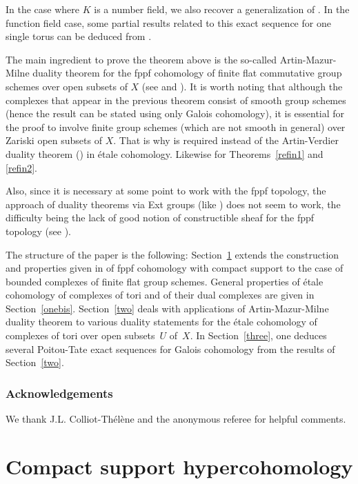 \documentclass[JEP,XML,SOM,Unicode, NoEqCountersInSection]{cedram}
\theoremstyle{plain}
\theoremstyle{definition}
\begin{document}
In the case where $K$ is a number field, we also recover a generalization of \cite[Th.\,6.1 \& 6.3]{demphd}. In the function field case, some partial results related to this exact sequence for one single torus can be deduced from \cite[\S6]{gonz1}.

The main ingredient to prove the theorem above is the so-called Artin-Mazur-Milne duality theorem for the fppf cohomology of finite flat commutative group schemes over open subsets of $X$ (see \cite[Th.\,III.8.2]{MilADT} and \cite[Th.\,1.1]{DemH}).
It is worth noting that although the complexes that appear in the previous
theorem consist of smooth group schemes (hence the result can be stated
using only Galois cohomology), it is essential for the proof to involve
finite group schemes (which are not
smooth in general) over Zariski open subsets of $X$. That is why
\cite[Th.\,1.1]{DemH} is required instead of the Artin-Verdier
duality theorem (\cite[Cor.\,II.3.3]{MilADT}) in étale cohomology.
Likewise for Theorems~\ref{refin1} and \ref{refin2}.\enlargethispage{-\baselineskip}%

Also, since it is necessary at some point to work with the fppf topology,
the approach of duality theorems via Ext groups (like \cite[Th.\,II.3.1]{MilADT}) does not seem to work, the difficulty being the lack of good
notion of constructible sheaf for the fppf topology (see \cite[Introduction to Chap.\,III]{MilADT}).

The structure of the paper is the following: Section~\ref{one} extends the construction and properties given in \cite{DemH} of fppf cohomology with compact support to the case of bounded complexes of finite flat group schemes. General properties of étale cohomology of complexes of tori and of their dual complexes are given in Section~\ref{onebis}. Section~\ref{two} deals with applications of Artin-Mazur-Milne duality theorem to various duality statements for the étale cohomology of complexes of tori over open subsets~$U$ of~$X$. In Section~\ref{three}, one deduces several Poitou-Tate exact sequences for Galois cohomology from the results of Section~\ref{two}.

\subsubsection*{Acknowledgements}
We thank J.L. Colliot-Thélène and the anonymous referee
for helpful comments.

\section{Compact support hypercohomology} \label{one}
\end{document}
